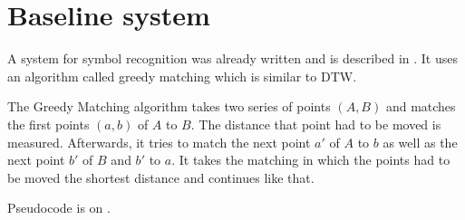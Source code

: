 
\chapter{Baseline system} %
\label{ch:Content1}


A system for symbol recognition was already written and is described in \cite{Kirsch}.
It uses an algorithm called greedy matching which is similar to \Gls{DTW}.

The Greedy Matching algorithm takes two series of points $(A, B)$ and matches
the first points $(a,b)$ of $A$ to $B$. The distance that point had to be moved is
measured. Afterwards, it tries to match the next point $a'$ of $A$ to $b$ as
well as the next point $b'$ of $B$ and $b'$ to $a$. It takes the matching in
which the points had to be moved the shortest distance and continues like that.

Pseudocode is on .



